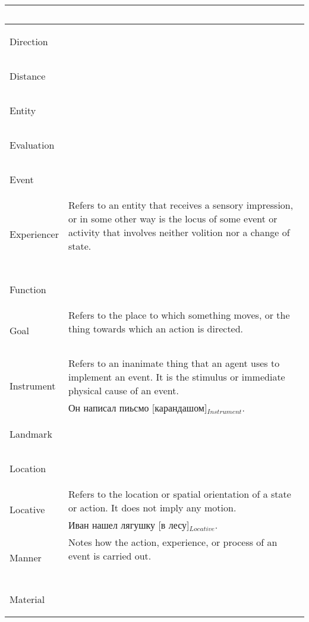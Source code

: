 \documentclass[a4paper,11pt, onecolumn,twoside]{article}
\begin{document}
\begin{longtable}{ p{}  p{} }
        & ~ \\
\midrule
 \multirow{2}{*}{Direction} & ~ \\ 
        & ~ \\
\midrule
 \multirow{2}{*}{Distance} & ~ \\ 
        & ~ \\
\midrule
 \multirow{2}{*}{Entity} & ~ \\ 
        & ~ \\
\midrule
 \multirow{2}{*}{Evaluation} & ~ \\ 
        & ~ \\
\midrule
 \multirow{2}{*}{Event} & ~ \\ 
        & ~ \\
\midrule
 \multirow{2}{*}{Experiencer} & Refers to an entity that receives a sensory impression, or in some other way is the locus of some event or activity that involves neither volition nor a change of state. \\ 
        & ~ \\
\midrule
 \multirow{2}{*}{Function} & ~ \\ 
        & ~ \\
\midrule
 \multirow{2}{*}{Goal} & Refers to the place to which something moves, or the thing towards which an action is directed. \\ 
        & ~ \\
\midrule
 \multirow{2}{*}{Instrument} & Refers to an inanimate thing that an agent uses to implement an event. It is the stimulus or immediate physical cause of an event. \\ 
        & Он написал пиьсмо [карандашом]$_{Instrument}$. \\
\midrule
 \multirow{2}{*}{Landmark} & ~ \\ 
        & ~ \\
\midrule
 \multirow{2}{*}{Location} & ~ \\ 
        & ~ \\
\midrule
 \multirow{2}{*}{Locative} & Refers to the location or spatial orientation of a state or action. It does not imply any motion. \\ 
        & Иван нашел лягушку [в лесу]$_{Locative}$. \\
\midrule
 \multirow{2}{*}{Manner} & Notes how the action, experience, or process of an event is carried out. \\ 
        & ~ \\
\midrule
 \multirow{2}{*}{Material} & ~ \\ 
        & ~ \\

\end{longtable}
\end{document}
